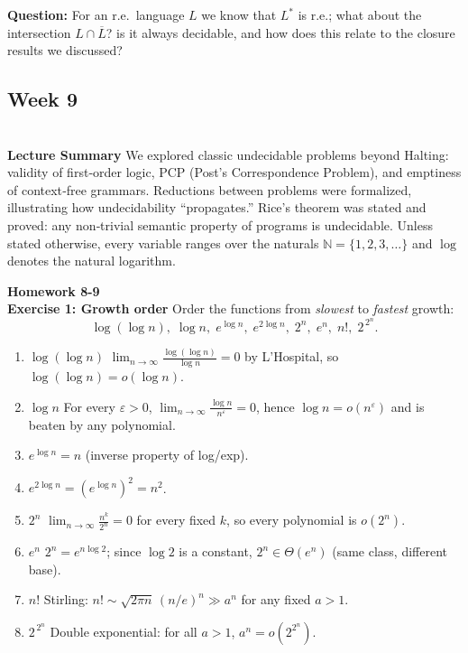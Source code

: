 \documentclass{article}
\theoremstyle{theorem}
\theoremstyle{definition}
\theoremstyle{remark}
\begin{document}
\textbf{Question: } For an r.e.\ language \(L\) we know that \(L^{*}\) is r.e.; what about the intersection  
        \(L \cap \overline{L}\)? is it always decidable, and how does this relate to the closure results we discussed?



\subsection{Week 9}\\
\textbf{Lecture Summary}
We explored classic undecidable problems beyond Halting: validity of first‐order logic, PCP (Post’s Correspondence Problem), and emptiness of context‐free grammars.  Reductions between problems were formalized, illustrating how undecidability “propagates.”  Rice’s theorem was stated and proved: any non‐trivial semantic property of programs is undecidable. Unless stated otherwise, every variable ranges over the naturals $\mathbb N=\{1,2,3,\dots\}$ and $\log$ denotes the natural logarithm.


\textbf{Homework 8-9}\\
\textbf{Exercise 1: Growth order}
Order the functions from \emph{slowest} to \emph{fastest} growth:
\[
\log(\log n),\;
\log n,\;
e^{\log n},\;
e^{2\log n},\;
2^{n},\;
e^{n},\;
n!,\;
2^{\,2^{n}}.
\]

\begin{enumerate}
  \item $\log(\log n)$ \quad 
        $\displaystyle\lim_{n\to\infty}\frac{\log(\log n)}{\log n}=0$  
        by L’Hospital, so $\log(\log n)=o(\log n)$.

  \item $\log n$ \quad 
        For every $\varepsilon>0$, $\displaystyle\lim_{n\to\infty}\frac{\log n}{n^\varepsilon}=0$,  
        hence $\log n=o(n^\varepsilon)$ and is beaten by any polynomial.        

  \item $e^{\log n}=n$ \quad (inverse property of log/exp).

  \item $e^{2\log n}=(e^{\log n})^{2}=n^{2}$.

  \item $2^{n}$ \quad 
        $\displaystyle\lim_{n\to\infty}\frac{n^{k}}{2^{n}}=0$ for every fixed $k$,  
        so every polynomial is $o(2^{n})$.

  \item $e^{n}$ \quad  
        $2^{n}=e^{n\log 2}$; since $\log 2$ is a constant,  
        $2^{n}\in\Theta(e^{n})$ (same class, different base).

  \item $n!$ \quad  
        Stirling: $n!\sim\sqrt{2\pi n}\,(n/e)^{n}\gg a^{n}$ for any fixed $a>1$.

  \item $2^{\,2^{n}}$ \quad  
        Double exponential: for all $a>1$, $a^{n}=o(2^{2^{n}})$.
\end{enumerate}
\end{document}
